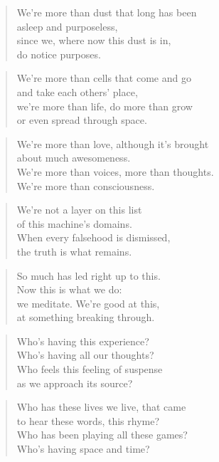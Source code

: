 \documentclass[14pt,a4paper]{article}
\begin{document}
\begin{verse}
We’re more than dust that long has been\\
asleep and purposeless,\\
since we, where now this dust is in,\\
do notice purposes.
\end{verse}

\begin{verse}
We’re more than cells that come and go\\
and take each others’ place,\\
we’re more than life, do more than grow\\
or even spread through space.
\end{verse}

\begin{verse}
We’re more than love, although it’s brought\\
about much awesomeness.\\
We’re more than voices, more than thoughts.\\
We’re more than consciousness.
\end{verse}

\begin{verse}
We’re not a layer on this list\\
of this machine’s domains.\\
When every falsehood is dismissed,\\
the truth is what remains.
\end{verse}

\begin{verse}
So much has led right up to this.\\
Now this is what we do:\\
we meditate. We’re good at this,\\
at something breaking through.
\end{verse}

\begin{verse}
Who’s having this experience?\\
Who’s having all our thoughts?\\
Who feels this feeling of suspense\\
as we approach its source?
\end{verse}

\begin{verse}
Who has these lives we live, that came\\
to hear these words, this rhyme?\\
Who has been playing all these games?\\
Who’s having space and time?
\end{verse}
\end{document}
